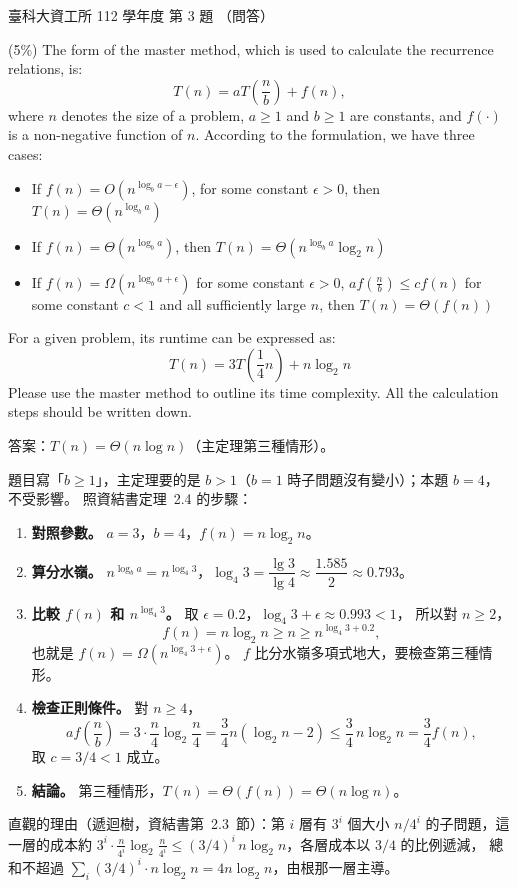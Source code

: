 \begin{pastexam}[label={px:ntust-112-ice-03}]{臺科大資工所 112 學年度 第 3 題}
（問答）

(5\%) The form of the master method, which is used to calculate the recurrence relations, is:
\[ T(n)=aT\left(\frac{n}{b}\right)+f(n), \]
where $n$ denotes the size of a problem, $a\ge 1$ and $b\ge 1$ are constants, and $f(\cdot)$ is a
non-negative function of $n$. According to the formulation, we have three cases:
\begin{itemize}
\item If $f(n)=O(n^{\log_b a-\epsilon})$, for some constant $\epsilon>0$, then
$T(n)=\Theta(n^{\log_b a})$
\item If $f(n)=\Theta(n^{\log_b a})$, then $T(n)=\Theta(n^{\log_b a}\log_2 n)$
\item If $f(n)=\Omega(n^{\log_b a+\epsilon})$ for some constant $\epsilon>0$,
$af(\frac{n}{b})\le cf(n)$ for some constant $c<1$ and all sufficiently large $n$, then
$T(n)=\Theta(f(n))$
\end{itemize}
For a given problem, its runtime can be expressed as:
\[ T(n)=3T\left(\frac{1}{4}n\right)+n\log_2 n \]
Please use the master method to outline its time complexity. All the calculation steps should be
written down.
\end{pastexam}

\begin{pastsoln}
答案：$T(n) = \Theta(n \log n)$（主定理第三種情形）。

題目寫「$b \ge 1$」，主定理要的是 $b > 1$（$b = 1$ 時子問題沒有變小）；本題 $b = 4$，不受影響。
照資結書定理~2.4 的步驟：
\begin{enumerate}
\item \textbf{對照參數。} $a = 3$，$b = 4$，$f(n) = n \log_2 n$。
\item \textbf{算分水嶺。} $n^{\log_b a} = n^{\log_4 3}$，$\log_4 3 = \dfrac{\lg 3}{\lg 4} \approx \dfrac{1.585}{2}
\approx 0.793$。
\item \textbf{比較 $f(n)$ 和 $n^{\log_4 3}$。} 取 $\epsilon = 0.2$，$\log_4 3 + \epsilon \approx 0.993 < 1$，
所以對 $n \ge 2$，
\[
f(n) = n \log_2 n \ge n \ge n^{\log_4 3 + 0.2},
\]
也就是 $f(n) = \Omega(n^{\log_4 3 + \epsilon})$。 $f$ 比分水嶺多項式地大，要檢查第三種情形。
\item \textbf{檢查正則條件。} 對 $n \ge 4$，
\[
a f\!\left(\frac{n}{b}\right) = 3 \cdot \frac{n}{4} \log_2 \frac{n}{4}
= \frac34 n (\log_2 n - 2) \le \frac34\, n \log_2 n = \frac34 f(n),
\]
取 $c = 3/4 < 1$ 成立。
\item \textbf{結論。} 第三種情形，$T(n) = \Theta(f(n)) = \Theta(n \log n)$。
\end{enumerate}

直觀的理由（遞迴樹，資結書第~2.3~節）：第 $i$ 層有 $3^i$ 個大小 $n/4^i$ 的子問題，這一層的成本約
$3^i \cdot \frac{n}{4^i} \log_2 \frac{n}{4^i} \le (3/4)^i\, n \log_2 n$，各層成本以 $3/4$ 的比例遞減，
總和不超過 $\sum_i (3/4)^i \cdot n \log_2 n = 4 n \log_2 n$，由根那一層主導。
\end{pastsoln}
